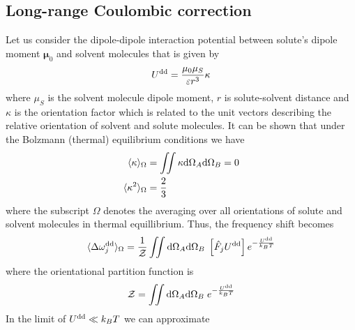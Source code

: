 \documentclass[a4paper,titlepage,twoside,fleqn,12pt]{book}
\newcommand{\BM}[1]{\bm{#1}}
\begin{document}
\begin{refsection}

\subsection{Long\hyp{}range Coulombic correction}

Let us consider the dipole\hyp{}dipole interaction
potential between solute's dipole moment ${\BM \mu}_0$ 
and solvent molecules that is given by 
%
\begin{equation}
 U^{\rm dd} = \frac{\mu_0\mu_S}{\varepsilon r^3} \kappa
\end{equation}
%
where $\mu_S$ is the solvent molecule dipole moment, 
$r$ is solute\hyp{}solvent distance 
and $\kappa$ is the orientation factor which is related
to the unit vectors describing the relative orientation
of solvent and solute molecules. 
It can be shown that 
under the Bolzmann (thermal) equilibrium conditions we have
%
\begin{subequations}
\begin{align} \label{e:73626}
 \langle \kappa \rangle_{\Omega} &= \iint \kappa {\rm d}\Omega_A{\rm d}\Omega_B  = 0 \\
 \langle \kappa^2 \rangle_{\Omega} &= \frac{2}{3}
\end{align}
\end{subequations}
%
where the subscript
$\Omega$ denotes the averaging over all orientations of 
solute and solvent molecules in thermal equillibrium.\citep{London.TransFaradSoc.1937}
Thus, the frequency shift becomes
%
\begin{equation}
 \langle \Delta \omega_j^{\rm dd} \rangle_{\Omega} = 
\frac{1}{\mathcal{Z}} 
\iint {\rm d}\Omega_A{\rm d}\Omega_B \; \left[\hat{F}_j U^{\rm dd}\right] e^{-\frac{U^{\rm dd}}{k_BT}} 
\end{equation}
%
where the orientational 
partition function is
%
\begin{equation}
\mathcal{Z} =
\iint {\rm d}\Omega_A{\rm d}\Omega_B \; e^{-\frac{U^{\rm dd}}{k_BT}}
\end{equation}
%
In the limit of $U^{\rm dd}\ll k_BT$ we can approximate 

\end{refsection}
\end{document}
